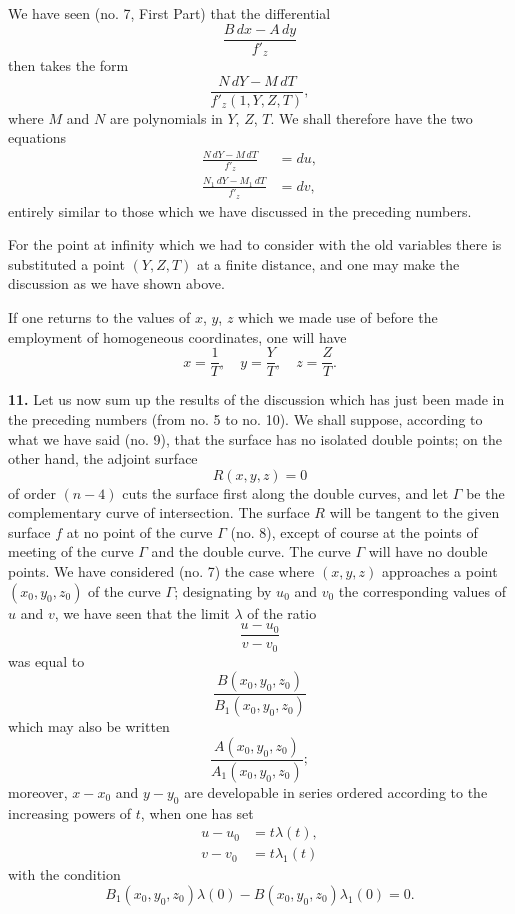 \documentclass{article}
\begin{document}
We have seen (no. 7, First Part) that the differential
\[
\frac{B\,dx - A\,dy}{f'_{z}}
\]
then takes the form
\[
\frac{N\,dY - M\,dT}{f'_{z}(1, Y, Z, T)},
\]
where $M$ and $N$ are polynomials in $Y$, $Z$, $T$. We shall therefore have the two equations
\[
\begin{aligned}
\frac{N\,dY - M\,dT}{f'_{z}} &= du, \\
\frac{N_{1}\,dY - M_{1}\,dT}{f'_{z}} &= dv,
\end{aligned}
\]
entirely similar to those which we have discussed in the preceding numbers.

For the point at infinity which we had to consider with the old variables there is substituted a point $(Y, Z, T)$ at a finite distance, and one may make the discussion as we have shown above.

If one returns to the values of $x$, $y$, $z$ which we made use of before the employment of homogeneous coordinates, one will have
\[
x = \frac{1}{T}, \quad y = \frac{Y}{T}, \quad z = \frac{Z}{T}.
\]

\textbf{11.} Let us now sum up the results of the discussion which has just been made in the preceding numbers (from no. 5 to no. 10). We shall suppose, according to what we have said (no. 9), that the surface has no isolated double points; on the other hand, the adjoint surface
\[
R(x, y, z) = 0
\]
of order $(n - 4)$ cuts the surface first along the double curves, and let $\Gamma$ be the complementary curve of intersection. The surface $R$ will be tangent to the given surface $f$ at no point of the curve $\Gamma$ (no. 8), except of course at the points of meeting of the curve $\Gamma$ and the double curve. The curve $\Gamma$ will have no double points. We have considered (no. 7) the case where $(x, y, z)$ approaches a point $(x_{0}, y_{0}, z_{0})$ of the curve $\Gamma$; designating by $u_{0}$ and $v_{0}$ the corresponding values of $u$ and $v$, we have seen that the limit $\lambda$ of the ratio
\[
\frac{u - u_{0}}{v - v_{0}}
\]
was equal to
\[
\frac{B(x_{0}, y_{0}, z_{0})}{B_{1}(x_{0}, y_{0}, z_{0})}
\]
which may also be written
\[
\frac{A(x_{0}, y_{0}, z_{0})}{A_{1}(x_{0}, y_{0}, z_{0})};
\]
moreover, $x - x_{0}$ and $y - y_{0}$ are developable in series ordered according to the increasing powers of $t$, when one has set
\[
\begin{aligned}
u - u_{0} &= t\lambda(t), \\
v - v_{0} &= t\lambda_{1}(t)
\end{aligned}
\]
with the condition
\[
B_{1}(x_{0}, y_{0}, z_{0})\lambda(0) - B(x_{0}, y_{0}, z_{0})\lambda_{1}(0) = 0.
\]
\end{document}
